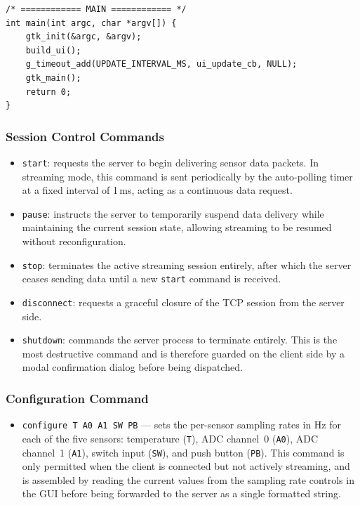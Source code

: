 \begin{verbatim}
/* ============ MAIN ============ */
int main(int argc, char *argv[]) {
    gtk_init(&argc, &argv);
    build_ui();
    g_timeout_add(UPDATE_INTERVAL_MS, ui_update_cb, NULL);
    gtk_main();
    return 0;
}
\end{verbatim}






\subsubsection*{Session Control Commands}

\begin{itemize}
    \item \texttt{start}: requests the server to begin delivering sensor data
          packets. In streaming mode, this command is sent periodically by the
          auto-polling timer at a fixed interval of \mbox{1\,ms}, acting as a
          continuous data request.

    \item \texttt{pause}: instructs the server to temporarily suspend data
          delivery while maintaining the current session state, allowing streaming
          to be resumed without reconfiguration.

    \item \texttt{stop}: terminates the active streaming session entirely, after
          which the server ceases sending data until a new \texttt{start} command
          is received.

    \item \texttt{disconnect}: requests a graceful closure of the TCP session
          from the server side.

    \item \texttt{shutdown}: commands the server process to terminate entirely.
          This is the most destructive command and is therefore guarded on the
          client side by a modal confirmation dialog before being dispatched.
\end{itemize}

\subsubsection*{Configuration Command}

\begin{itemize}
    \item \texttt{configure T A0 A1 SW PB} --- sets the per-sensor sampling rates
          in Hz for each of the five sensors: temperature (\texttt{T}), ADC
          channel~0 (\texttt{A0}), ADC channel~1 (\texttt{A1}), switch input
          (\texttt{SW}), and push button (\texttt{PB}). This command is only
          permitted when the client is connected but not actively streaming, and
          is assembled by reading the current values from the sampling rate
          controls in the GUI before being forwarded to the server as a single
          formatted string.
\end{itemize}

